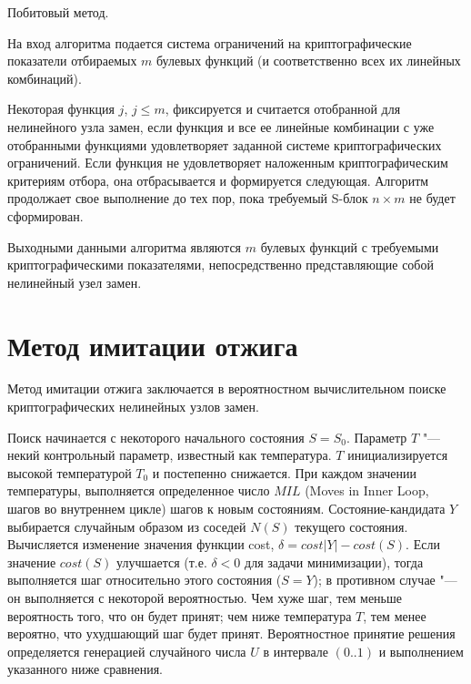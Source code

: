 Побитовый метод.

На вход алгоритма подается система ограничений на криптографические показатели
отбираемых $m$ булевых функций (и соответственно всех их линейных комбинаций).

Некоторая функция $j$, $j \leq m$, фиксируется и считается отобранной для
нелинейного узла замен, если функция и все ее линейные комбинации с уже
отобранными функциями удовлетворяет заданной системе криптографических
ограничений. Если функция не удовлетворяет наложенным криптографическим
критериям отбора, она отбрасывается и формируется следующая. Алгоритм продолжает
свое выполнение до тех пор, пока требуемый S-блок $n \times m$ не будет сформирован.

Выходными данными алгоритма являются $m$ булевых функций с требуемыми
криптографическими показателями, непосредственно представляющие собой нелинейный
узел замен.

\section{Метод имитации отжига}
\label{section:simulated_annealing}

Метод имитации отжига заключается в вероятностном вычислительном поиске
криптографических нелинейных узлов замен.

Поиск начинается с некоторого начального состояния $S=S_0$. Параметр $T$ "---
некий контрольный параметр, известный как температура. $T$ инициализируется
высокой температурой $T_0$ и постепенно снижается. При каждом значении
температуры, выполняется определенное число $MIL$ (Moves in Inner Loop, шагов во
внутреннем цикле) шагов к новым состояниям. Состояние-кандидата $Y$ выбирается
случайным образом из соседей $N(S)$ текущего состояния. Вычисляется изменение
значения функции cost, $\delta=cost|Y| - cost(S)$. Если значение $cost(S)$
улучшается (т.е. $\delta < 0$ для задачи минимизации), тогда выполняется шаг
относительно этого состояния ($S = Y$); в противном случае "--- он выполняется с
некоторой вероятностью. Чем хуже шаг, тем меньше вероятность того, что он будет
принят; чем ниже температура $T$, тем менее вероятно, что ухудшающий шаг будет
принят. Вероятностное принятие решения определяется генерацией случайного числа
$U$ в интервале $(0..1)$ и выполнением указанного ниже сравнения.

